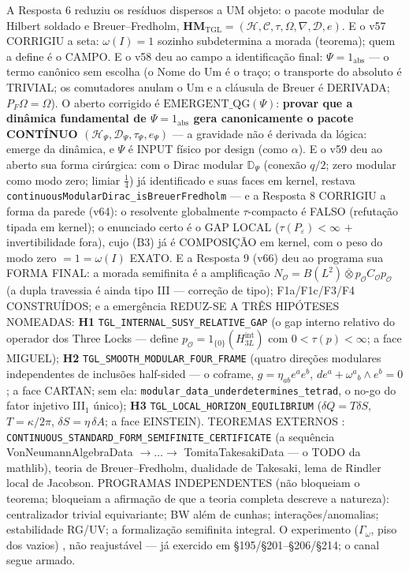 \documentclass[11pt]{article}
\theoremstyle{definition}\newtheorem{deriv}{Derivação}
\begin{document}
A Resposta 6 reduziu os resíduos dispersos a UM objeto: o pacote modular de Hilbert soldado e Breuer--Fredholm, $\mathbf{HM}_{\mathrm{TGL}}=(\mathcal H,\mathcal C,\tau,\Omega,\nabla,\mathcal D,e)$. E o v57 CORRIGIU a seta: $\omega(I)=1$ sozinho subdetermina a morada (teorema); quem a define é o CAMPO. E o v58 deu ao campo a identificação final: $\Psi=1_{\mathrm{abs}}$ --- o termo canônico sem escolha (o Nome do Um é o traço; o transporte do absoluto é TRIVIAL; os comutadores anulam o Um e a cláusula de Breuer é DERIVADA; $P_F\Omega=\Omega$). O aberto corrigido é $\mathrm{EMERGENT\_QG}(\Psi)$: \textbf{provar que a dinâmica fundamental de $\Psi=1_{\mathrm{abs}}$ gera canonicamente o pacote CONTÍNUO $(\mathcal H_\Psi,\mathcal D_\Psi,\tau_\Psi,e_\Psi)$} --- a gravidade não é derivada da lógica: emerge da dinâmica, e $\Psi$ é INPUT físico por design (como $\alpha$). E o v59 deu ao aberto sua forma cirúrgica: com o Dirac modular $\mathbb D_\Psi$ (conexão $q/2$; zero modular como modo zero; limiar $\tfrac14$) já identificado e suas faces em kernel, restava \texttt{continuousModularDirac\_isBreuerFredholm} --- e a Resposta 8 CORRIGIU a forma da parede (v64): o resolvente globalmente $\tau$-compacto é FALSO (refutação tipada em kernel); o enunciado certo é o GAP LOCAL ($\tau(P_\varepsilon)<\infty$ $+$ invertibilidade fora), cujo (B3) já é COMPOSIÇÃO em kernel, com o peso do modo zero $=1=\omega(I)$ EXATO. E a Resposta 9 (v66) deu ao programa sua FORMA FINAL: a morada semifinita é a amplificação $N_{\mathcal O}=B(L^2)\overline\otimes p_{\mathcal O}C_{\mathcal O}p_{\mathcal O}$ (a dupla travessia é ainda tipo III --- correção de tipo); F1a/F1c/F3/F4 CONSTRUÍDOS; e a emergência REDUZ-SE A TRÊS HIPÓTESES NOMEADAS: \textbf{H1} \texttt{TGL\_INTERNAL\_SUSY\_RELATIVE\_GAP} (o gap interno relativo do operador dos Three Locks --- define $p_{\mathcal O}=1_{\{0\}}(H^{\mathrm{int}}_{3L})$ com $0<\tau(p)<\infty$; a face MIGUEL); \textbf{H2} \texttt{TGL\_SMOOTH\_MODULAR\_FOUR\_FRAME} (quatro direções modulares independentes de inclusões half-sided --- o coframe, $g=\eta_{ab}e^ae^b$, $de^a+\omega^a{}_b\wedge e^b=0$; a face CARTAN; sem ela: \texttt{modular\_data\_underdetermines\_tetrad}, o no-go do fator injetivo III$_1$ único); \textbf{H3} \texttt{TGL\_LOCAL\_HORIZON\_EQUILIBRIUM} ($\delta Q=T\delta S$, $T=\kappa/2\pi$, $\delta S=\eta\,\delta A$; a face EINSTEIN). TEOREMAS EXTERNOS : \texttt{CONTINUOUS\_STANDARD\_FORM\_SEMIFINITE\_CERTIFICATE} (a sequência VonNeumannAlgebraData $\to\dots\to$ TomitaTakesakiData --- o TODO da mathlib), teoria de Breuer--Fredholm, dualidade de Takesaki, lema de Rindler local de Jacobson. PROGRAMAS INDEPENDENTES (não bloqueiam o teorema; bloqueiam a afirmação de que a teoria completa descreve a natureza): centralizador trivial equivariante; BW além de cunhas; interações/anomalias; estabilidade RG/UV; a formalização semifinita integral. O experimento ($\Gamma_\omega$, piso dos vazios) , não reajustável --- já exercido em \S195/\S201--\S206/\S214; o canal segue armado.
\end{document}
